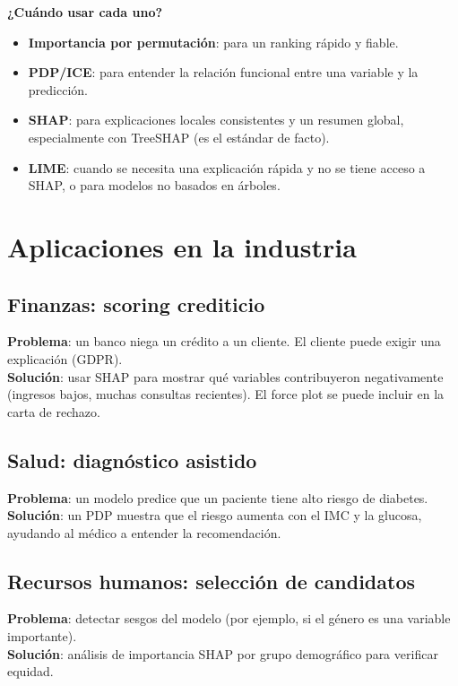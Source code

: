 \documentclass[12pt,a4paper,openany,oneside]{book}
\begin{document}
\textbf{¿Cuándo usar cada uno?}
\begin{itemize}
    \item \textbf{Importancia por permutación}: para un ranking rápido y fiable.
    \item \textbf{PDP/ICE}: para entender la relación funcional entre una variable y la predicción.
    \item \textbf{SHAP}: para explicaciones locales consistentes y un resumen global, especialmente con TreeSHAP (es el estándar de facto).
    \item \textbf{LIME}: cuando se necesita una explicación rápida y no se tiene acceso a SHAP, o para modelos no basados en árboles.
\end{itemize}

\section{Aplicaciones en la industria}

\subsection{Finanzas: scoring crediticio}
\textbf{Problema}: un banco niega un crédito a un cliente. El cliente puede exigir una explicación (GDPR). \\
\textbf{Solución}: usar SHAP para mostrar qué variables contribuyeron negativamente (ingresos bajos, muchas consultas recientes). El force plot se puede incluir en la carta de rechazo.

\subsection{Salud: diagnóstico asistido}
\textbf{Problema}: un modelo predice que un paciente tiene alto riesgo de diabetes. \\
\textbf{Solución}: un PDP muestra que el riesgo aumenta con el IMC y la glucosa, ayudando al médico a entender la recomendación.

\subsection{Recursos humanos: selección de candidatos}
\textbf{Problema}: detectar sesgos del modelo (por ejemplo, si el género es una variable importante). \\
\textbf{Solución}: análisis de importancia SHAP por grupo demográfico para verificar equidad.
\end{document}

